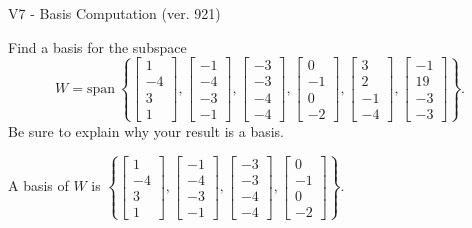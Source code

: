\begin{exercise}
  \begin{exerciseTitle}V7 - Basis Computation (ver. 921)\end{exerciseTitle}
  \begin{exerciseStatement}
    Find a basis for the subspace 
\[W=\mathrm{span}\ \left\{\left[\begin{array}{r}
1 \\
-4 \\
3 \\
1
\end{array}\right] , \left[\begin{array}{r}
-1 \\
-4 \\
-3 \\
-1
\end{array}\right] , \left[\begin{array}{r}
-3 \\
-3 \\
-4 \\
-4
\end{array}\right] , \left[\begin{array}{r}
0 \\
-1 \\
0 \\
-2
\end{array}\right] , \left[\begin{array}{r}
3 \\
2 \\
-1 \\
-4
\end{array}\right] , \left[\begin{array}{r}
-1 \\
19 \\
-3 \\
-3
\end{array}\right]\right\}.\]
 Be sure to explain why your result is a basis.


  \end{exerciseStatement}
  \begin{exerciseAnswer}
   A basis of \(W\) is  \(\left\{\left[\begin{array}{r}
1 \\
-4 \\
3 \\
1
\end{array}\right] , \left[\begin{array}{r}
-1 \\
-4 \\
-3 \\
-1
\end{array}\right] , \left[\begin{array}{r}
-3 \\
-3 \\
-4 \\
-4
\end{array}\right] , \left[\begin{array}{r}
0 \\
-1 \\
0 \\
-2
\end{array}\right]\right\}\).
  


  \end{exerciseAnswer}
\end{exercise}